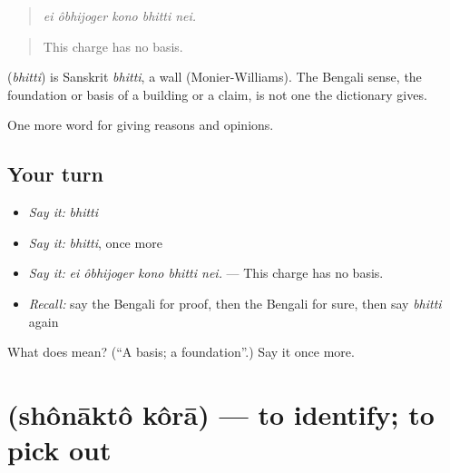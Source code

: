 \begin{quote}
    
\end{quote}

\begin{quote}
\emph{ei ôbhijoger kono bhitti nei.}
\end{quote}

\begin{quote}
This charge has no basis.
\end{quote}

\begin{cousinweb}
\textbf{} (\emph{bhitti}) is Sanskrit \emph{bhitti}, a wall (Monier-Williams). The Bengali sense, the foundation or basis of a building or a claim, is not one the dictionary gives.
\end{cousinweb}

\begin{grammarlens}[title={What you've built}]
One more word for giving reasons and opinions.
\end{grammarlens}

\subsection*{Your turn}
\begin{itemize}
\raggedright
  \item \emph{Say it:} \emph{bhitti}
  \item \emph{Say it:} \emph{bhitti}, once more
  \item \emph{Say it:} \emph{ei ôbhijoger kono bhitti nei.} — This charge has no basis.
  \item \emph{Recall:} say the Bengali for proof, then the Bengali for sure, then say \emph{bhitti} again
\end{itemize}

\begin{tcolorbox}[breakable,colback=teal!4,colframe=teal!35!black,title={Before you move on}]
What does  mean? (\textquotedblleft{}A basis; a foundation\textquotedblright{}.) Say it once more.
\end{tcolorbox}
\section[\texorpdfstring{\bn{শনাক্ত} \bn{করা} (shônāktô kôrā)}{শনাক্ত করা (shônāktô kôrā)}]{  (shônāktô kôrā) — to identify; to pick out}

\label{lesson:BN-C337-shonakto-kora}



